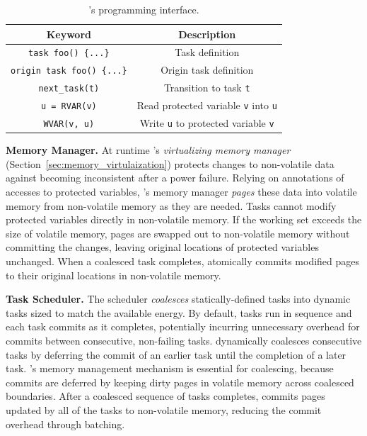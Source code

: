 \begin{table}
	\centering
	\footnotesize
	\begin{tabular}{|c|c|}
		\hline
		\textbf{Keyword} & \textbf{Description} \\
		\hline\hline
		\texttt{task foo() \{...\}} & Task definition\\
		\texttt{origin task foo() \{...\}} & Origin task definition\\
		\texttt{next\_task(t)} & Transition to task \texttt{t}\\
		\texttt{u = RVAR(v)} & Read protected variable \texttt{v} into \texttt{u}\\
		\texttt{WVAR(v, u)} & Write \texttt{u} to protected variable \texttt{v}\\
		\hline
	\end{tabular}
	\caption{\sys's programming interface.}
	\label{tab:viper_syntax}
\end{table}

\textbf{\sys Memory Manager.} At runtime \sys's \emph{virtualizing memory
manager} (Section~\ref{sec:memory_virtulaization}) protects changes to
non-volatile data against becoming inconsistent after a power failure.  Relying
on annotations of accesses to protected variables, \sys's memory manager {\em
pages} these data into volatile memory from non-volatile memory as they are
needed.  Tasks cannot modify protected variables directly in non-volatile
memory.  If the working set exceeds the size of volatile memory, pages are
swapped out to non-volatile memory without committing the changes, leaving
original locations of protected variables unchanged.  When a coalesced task
completes, \sys atomically commits modified pages to their original locations
in non-volatile memory.

\textbf{\sys Task Scheduler.} The scheduler
{\em coalesces} statically\hyp{}defined tasks into dynamic tasks sized to match
the available energy. By default, tasks run in sequence and each task commits
as it completes, potentially incurring unnecessary overhead for commits between
consecutive, non-failing tasks. \sys dynamically coalesces consecutive tasks by
deferring the commit of an earlier task until the completion of a later task.
\sys's memory management mechanism is essential for coalescing, because commits
are deferred by keeping dirty pages in volatile memory across coalesced
boundaries.  After a coalesced sequence of tasks completes, \sys commits pages
updated by all of the tasks to non-volatile memory, reducing the commit
overhead through batching.
